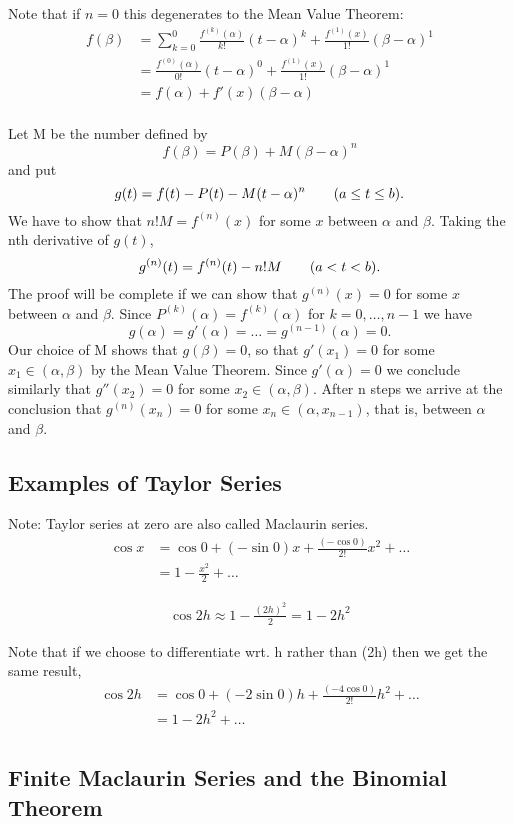 \documentclass[MathsNotesBase.tex]{subfiles}
\begin{document}
	Note that if $n = 0$ this degenerates to the Mean Value Theorem:
	\begin{align*}
	f(\beta) &= \sum_{k = 0}^{0}\frac{f^{(k)}(\alpha)}{k!}(t - \alpha)^k + \frac{f^{(1)}(x)}{1!}(\beta - \alpha)^1 \\
	&= \frac{f^{(0)}(\alpha)}{0!}(t - \alpha)^0 + \frac{f^{(1)}(x)}{1!}(\beta - \alpha)^1 \\
	&= f(\alpha) + f'(x)(\beta - \alpha) \\
	\end{align*}
	
		Let M be the number defined by 
			\[ f(\beta) = P(\beta) + M(\beta - \alpha)^n \]
		and put
			\[ g(t) = f(t) - P(t) - M(t - \alpha)^n \hspace*{20pt} (a \leq t \leq b). \]
		We have to show that $n!M = f^{(n)}(x)$ for some $x$ between $\alpha$ and $\beta$. Taking the nth derivative of $g(t)$,
			\[ g^{(n)}(t) = f^{(n)}(t) - n!M \hspace*{20pt} (a < t < b).\]
		The proof will be complete if we can show that $g^{(n)}(x) = 0$ for some $x$ between $\alpha$ and $\beta$. Since $P^{(k)}(\alpha) = f^{(k)}(\alpha)$ for $k = 0,\ldots, n-1$ we have
			\[ g(\alpha) = g'(\alpha) = \ldots = g^{(n - 1)}(\alpha) = 0. \]
		Our choice of M shows that $g(\beta) = 0$, so that $g'(x_1) = 0$ for some $x_1 \in (\alpha, \beta)$ by the Mean Value Theorem. Since $g'(\alpha) = 0$ we conclude similarly that $g''(x_2) = 0$ for some $x_2 \in (\alpha, \beta)$. After n steps we arrive at the conclusion that $g^{(n)}(x_n) = 0$ for some $x_n \in (\alpha, x_{n-1})$, that is, between $\alpha$ and $\beta$.

\bigskip		
\subsection*{Examples of Taylor Series}
\bigskip

	Note: Taylor series at zero are also called Maclaurin series.
	\begin{align*}
	\cos{x} &= \cos{0} + (-\sin{0})x + \frac{(-\cos{0})}{2!}x^2 + \ldots \\
	&= 1 - \frac{x^2}{2} + \ldots
	\end{align*}
	
	
	
	\begin{align*}
	\cos{2h} \approx 1 - \frac{(2h)^2}{2} = 1 - 2h^2
	\end{align*}
	
	Note that if we choose to differentiate wrt. h rather than (2h) then we get the same result,
	\begin{align*}
	\cos{2h} &= \cos{0} + (-2\sin{0})h + \frac{(-4\cos{0})}{2!}h^2 + \ldots \\
		&= 1 - 2h^2 + \ldots \\
	\end{align*}
	

\bigskip		
\subsection*{Finite Maclaurin Series and the Binomial Theorem}
\bigskip
\end{document}
